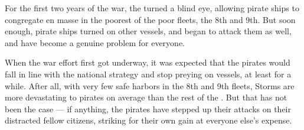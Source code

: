 \documentclass[blue]{GL2020}
\begin{document}
For the first two years of the war, the \pShippies{} turned a blind eye, allowing pirate ships to congregate en masse in the poorest of the poor fleets, the 8th and 9th. But soon enough, pirate ships turned on other \pShippie{} vessels, and began to attack them as well, and have become a genuine problem for everyone.

When the war effort first got underway, it was expected that the pirates would fall in line with the national strategy and stop preying on \pShippie{} vessels, at least for a while. After all, with very few safe harbors in the 8th and 9th fleets, Storms are more devastating to pirates on average than the rest of the \pShip{}. But that has not been the case — if anything, the pirates have stepped up their attacks on their distracted fellow citizens, striking for their own gain at everyone else's expense.
\end{document}
